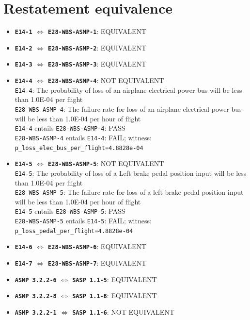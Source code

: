 \documentclass[11pt,a4paper]{article}
\begin{document}
\section{Restatement equivalence}
\begin{itemize}
\item \textbf{\texttt{E14-1} $\Leftrightarrow$ \texttt{E28-WBS-ASMP-1}}: EQUIVALENT
\item \textbf{\texttt{E14-2} $\Leftrightarrow$ \texttt{E28-WBS-ASMP-2}}: EQUIVALENT
\item \textbf{\texttt{E14-3} $\Leftrightarrow$ \texttt{E28-WBS-ASMP-3}}: EQUIVALENT
\item \textbf{\texttt{E14-4} $\Leftrightarrow$ \texttt{E28-WBS-ASMP-4}}: NOT EQUIVALENT \\
\texttt{E14-4}: The probability of loss of an airplane electrical power bus will be less than 1.0E-04 per flight \\
\texttt{E28-WBS-ASMP-4}: The failure rate for loss of an airplane electrical power bus will be less than 1.0E-04 per hour of flight \\
\texttt{E14-4} entails \texttt{E28-WBS-ASMP-4}: PASS \\
\texttt{E28-WBS-ASMP-4} entails \texttt{E14-4}: FAIL; witness: \texttt{p\_loss\_elec\_bus\_per\_flight=4.8828e-04}
\item \textbf{\texttt{E14-5} $\Leftrightarrow$ \texttt{E28-WBS-ASMP-5}}: NOT EQUIVALENT \\
\texttt{E14-5}: The probability of loss of a Left brake pedal position input will be less than 1.0E-04 per flight \\
\texttt{E28-WBS-ASMP-5}: The failure rate for loss of a left brake pedal position input will be less than 1.0E-04 per hour of flight \\
\texttt{E14-5} entails \texttt{E28-WBS-ASMP-5}: PASS \\
\texttt{E28-WBS-ASMP-5} entails \texttt{E14-5}: FAIL; witness: \texttt{p\_loss\_pedal\_per\_flight=4.8828e-04}
\item \textbf{\texttt{E14-6} $\Leftrightarrow$ \texttt{E28-WBS-ASMP-6}}: EQUIVALENT
\item \textbf{\texttt{E14-7} $\Leftrightarrow$ \texttt{E28-WBS-ASMP-7}}: EQUIVALENT
\item \textbf{\texttt{ASMP 3.2.2-6} $\Leftrightarrow$ \texttt{SASP 1.1-5}}: EQUIVALENT
\item \textbf{\texttt{ASMP 3.2.2-8} $\Leftrightarrow$ \texttt{SASP 1.1-8}}: EQUIVALENT
\item \textbf{\texttt{ASMP 3.2.2-1} $\Leftrightarrow$ \texttt{SASP 1.1-6}}: NOT EQUIVALENT \\

\end{itemize}
\end{document}
